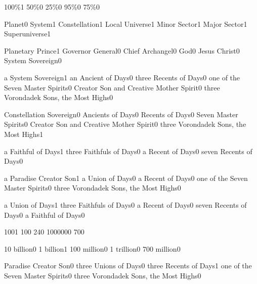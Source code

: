 {100\%}{1}
{50\%}{0}
{25\%}{0}
{95\%}{0}
{75\%}{0}
\qstop

{Planet}{0}
{System}{1}
{Constellation}{1}
{Local Universe}{1}
{Minor Sector}{1}
{Major Sector}{1}
{Superuniverse}{1}
\qstop

{Planetary Prince}{1}
{Governor General}{0}
{Chief Archangel}{0}
{God}{0}
{Jesus Christ}{0}
{System Sovereign}{0}
\qstop

{a System Sovereign}{1}
{an Ancient of Days}{0}
{three Recents of Days}{0}
{one of the Seven Master Spirits}{0}
{Creator Son and Creative Mother Spirit}{0}
{three Vorondadek Sons, the Most Highs}{0}
\qstop

{Constellation Sovereign}{0}
{Ancients of Days}{0}
{Recents of Days}{0}
{Seven Master Spirits}{0}
{Creator Son and Creative Mother Spirit}{0}
{three Vorondadek Sons, the Most Highs}{1}
\qstop

{a Faithful of Days}{1}
{three Faithfuls of Days}{0}
{a Recent of Days}{0}
{seven Recents of Days}{0}
\qstop

{a Paradise Creator Son}{1}
{a Union of Days}{0}
{a Recent of Days}{0}
{one of the Seven Master Spirits}{0}
{three Vorondadek Sons, the Most Highs}{0}
\qstop

{a Union of Days}{1}
{three Faithfuls of Days}{0}
{a Recent of Days}{0}
{seven Recents of Days}{0}
{a Faithful of Days}{0}
\qstop

{100}{1}
{10}{0}
{24}{0}
{100000}{0}
{70}{0}
\qstop

{10 billion}{0}
{1 billion}{1}
{100 million}{0}
{1 trillion}{0}
{700 million}{0}
\qstop

{Paradise Creator Son}{0}
{three Unions of Days}{0}
{three Recents of Days}{1}
{one of the Seven Master Spirits}{0}
{three Vorondadek Sons, the Most Highs}{0}
\qstop

